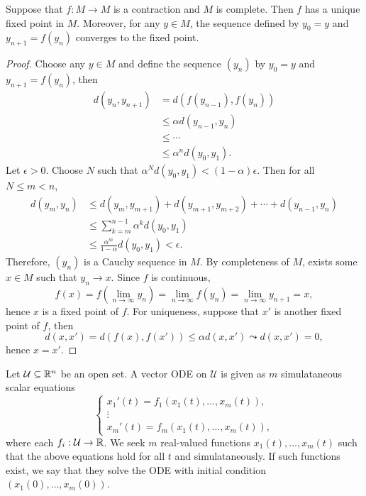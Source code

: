 \begin{thm}
    Suppose that $f: M \to M$ is a contraction and $M$ is complete. Then $f$ has a unique fixed point in $M$. Moreover, for any $y \in M$, the sequence defined by $y_0 = y$ and $y_{n+1} = f(y_n)$ converges to the fixed point.
    \begin{proof}
        Choose any $y \in M$ and define the sequence $(y_n)$ by $y_0 = y$ and $y_{n+1} = f(y_n)$, then
        \begin{align*}
            d(y_n, y_{n+1}) &= d(f(y_{n-1}), f(y_n)) \\
            &\leq \alpha d(y_{n-1}, y_n) \\
            &\leq \cdots \\
            &\leq \alpha^n d(y_0, y_1).
        \end{align*}
        Let $\epsilon > 0$. Choose $N$ such that $\alpha^N d(y_0, y_1) < (1 - \alpha) \epsilon$. Then for all $N \leq m < n$,
        \begin{align*}
            d(y_m, y_n) &\leq d(y_m, y_{m+1}) + d(y_{m+1}, y_{m+2}) + \cdots + d(y_{n-1}, y_n) \\
            &\leq \sum_{k=m}^{n-1} \alpha^k d(y_0, y_1) \\
            &\leq \frac{\alpha^m}{1 - \alpha} d(y_0, y_1) < \epsilon.
        \end{align*}
        Therefore, $(y_n)$ is a Cauchy sequence in $M$. By completeness of $M$, exists some $x \in M$ such that $y_n \to x$. Since $f$ is continuous,
        \[
        f(x) = f\left(\lim_{n \to \infty} y_n\right) = \lim_{n \to \infty} f(y_n) = \lim_{n \to \infty} y_{n+1} = x,
        \]
        hence $x$ is a fixed point of $f$. For uniqueness, suppose that $x'$ is another fixed point of $f$, then
        \[
        d(x, x') = d(f(x), f(x')) \leq \alpha d(x, x') \leadsto d(x, x') = 0,
        \]
        hence $x = x'$.
    \end{proof}
\end{thm}

Let $\mathcal U \subseteq {\mathbb R}^n$ be an open set. A vector ODE on $\mathcal U$ is given as $m$ simulataneous scalar equations
\[
\begin{cases}
    x_1'(t) = f_1(x_1(t), \ldots, x_m(t)), \\
    \vdots \\
    x_m'(t) = f_m(x_1(t), \ldots, x_m(t)),
\end{cases}
\]
where each $f_i: \mathcal U \to {\mathbb R}$. We seek $m$ real-valued functions $x_1(t), \ldots, x_m(t)$ such that the above equations hold for all $t$ and simulataneously. If such functions exist, we say that they solve the ODE with initial condition $(x_1(0), \ldots, x_m(0))$.

